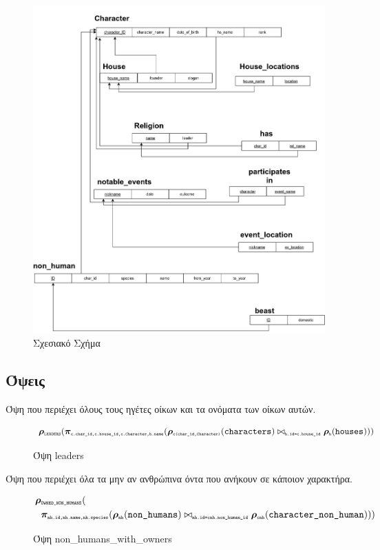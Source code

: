 \documentclass[../main.tex]{subfiles}
\begin{document}
\begin{figure}[H]
	\includegraphics[width=\textwidth]{../images/relation_diagram.png}
	\caption{Σχεσιακό Σχήμα}
\end{figure}

\subsection{Όψεις}


\noindent
Όψη που περιέχει όλους τους ηγέτες οίκων και τα ονόματα των οίκων
αυτών.
\begin{figure}[H]
	\begin{equation}
		\bm{\rho}_{\texttt{\tiny LEADERS}}
		(
		\bm{\pi}_{\texttt{\tiny c.char\_id,c.house\_id,c.Character,h.name}} (
		\bm{\rho}_{\texttt{\tiny c(char\_id,Character)}}(\texttt{characters})
		\bowtie_{\texttt{\tiny h.id=c.house\_id}}
		\bm{\rho}_{\texttt{\tiny h}}(\texttt{houses})
		))
	\end{equation}
	\caption{Όψη leaders}
\end{figure}

\noindent
Όψη που περιέχει όλα τα μην αν ανθρώπινα όντα που ανήκουν σε κάποιον
χαρακτήρα.
\begin{figure}[H]
	\begin{equation}
		\begin{aligned}
			\bm{\rho} & _{\texttt{\tiny OWNED\_NON\_HUMANS}} (               \\
			          & \bm{\pi}_{\texttt{\tiny nh.id,nh.name,nh.species}} (
			\bm{\rho}_{\texttt{\tiny nh}}(\texttt{non\_humans})
			\bowtie_{\texttt{\tiny nh.id=cnh.non\_human\_id}}
			\bm{\rho}_{\texttt{\tiny cnh}}(\texttt{character\_non\_human})
			))
		\end{aligned}
	\end{equation}
	\caption{Όψη non\_humans\_with\_owners}
\end{figure}
\end{document}
